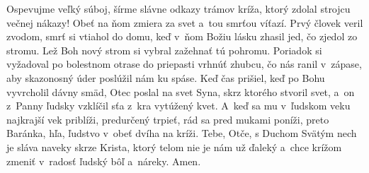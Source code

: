Ospevujme veľký súboj,
šírme slávne odkazy
trámov kríža, ktorý zdolal
strojcu večnej nákazy!
Obeť na ňom zmiera za svet
a~tou smrťou víťazí.
\versseparator
Prvý človek veril zvodom,
smrť si vtiahol do domu,
keď v~ňom Božiu lásku zhasil
jed, čo zjedol zo stromu.
Lež Boh nový strom si vybral
zažehnať tú pohromu.
\versseparator
Poriadok si vyžadoval
po bolestnom otrase
do priepasti vrhnúť zhubcu,
čo nás ranil v~zápase,
aby skazonosný úder
poslúžil nám ku spáse.
\versseparator
Keď čas prišiel, keď po Bohu
vyvrcholil dávny smäd,
Otec poslal na svet Syna,
skrz ktorého stvoril svet,
a~on z~Panny ľudsky vzklíčil
sťa z~kra vytúžený kvet.
\versseparator
A~keď sa mu v~ľudskom veku
najkrajší vek priblíži,
predurčený trpieť, rád sa
pred mukami poníži,
preto Baránka, hľa, ľudstvo
v~obeť dvíha na kríži.
\versseparator
Tebe, Otče, s Duchom Svätým
nech je sláva naveky
skrze Krista, ktorý telom
nie je nám už ďaleký
a~chce krížom zmeniť v~radosť
ľudský bôľ a~náreky. Amen.
